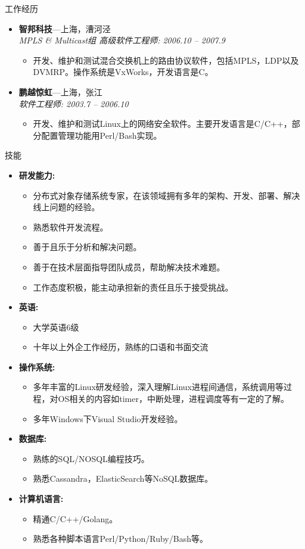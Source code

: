\documentclass[11pt,oneside]{article}
\newenvironment{ressection}[1]{
	\vspace{4pt}
	{\selectfont\Large#1}
	\begin{itemize}
	\vspace{3pt}
}{
	\end{itemize}
}
\newcommand{\resitem}[1]{
	\vspace{-4pt}
	\item \begin{flushleft} #1 \end{flushleft}
}
\newcommand{\ressubitem}[1]{
	\vspace{-1pt}
	\item \begin{flushleft} #1 \end{flushleft}
}
\newcommand{\resbigitem}[3]{
	\vspace{-5pt}
	\item
	\textbf{#1}---#2 \\
	\textit{#3}
}
\newenvironment{ressubsec}[3]{
	\resbigitem{#1}{#2}{#3}
	\vspace{-2pt}
	\begin{itemize}
}{
    \end{itemize}
}
\newenvironment{reslist}[1]{
	\resitem{\textbf{#1}}
	\vspace{-5pt}
	\begin{itemize}
}{
	\end{itemize}
}
\begin{document}
\begin{ressection}{工作经历}
	\begin{ressubsec}{智邦科技}{上海，漕河泾}{MPLS \& Multicast组 高级软件工程师: 2006.10 -- 2007.9}
		\ressubitem{开发、维护和测试混合交换机上的路由协议软件，包括MPLS，LDP以及DVMRP。操作系统是VxWorks，开发语言是C。}
	\end{ressubsec}

	\begin{ressubsec}{鹏越惊虹}{上海，张江}{软件工程师: 2003.7 -- 2006.10}
		\ressubitem{开发、维护和测试Linux上的网络安全软件。主要开发语言是C/C++，部分配置管理功能用Perl/Bash实现。}
	\end{ressubsec}

\end{ressection}

\begin{ressection}{技能}

	\begin{reslist}{研发能力:}
		\ressubitem{分布式对象存储系统专家，在该领域拥有多年的架构、开发、部署、解决线上问题的经验。}
		\ressubitem{熟悉软件开发流程。}
		\ressubitem{善于且乐于分析和解决问题。}
		\ressubitem{善于在技术层面指导团队成员，帮助解决技术难题。}
		\ressubitem{工作态度积极，能主动承担新的责任且乐于接受挑战。}
	\end{reslist}

	\begin{reslist}{英语:}
		\ressubitem{大学英语6级}
		\ressubitem{十年以上外企工作经历，熟练的口语和书面交流}
	\end{reslist}

	\begin{reslist}{操作系统:}
		\ressubitem{多年丰富的Linux研发经验，深入理解Linux进程间通信，系统调用等过程，对OS相关的内容如timer，中断处理，进程调度等有一定的了解。}
		\ressubitem{多年Windows下Visual Studio开发经验。}
	\end{reslist}

	\begin{reslist}{数据库:}
		\ressubitem{熟练的SQL/NOSQL编程技巧。}
		\ressubitem{熟悉Cassandra，ElasticSearch等NoSQL数据库。}
	\end{reslist}

	\begin{reslist}{计算机语言:}
		\ressubitem{精通C/C++/Golang。}
		\ressubitem{熟悉各种脚本语言Perl/Python/Ruby/Bash等。}
	\end{reslist}

\end{ressection}
\end{document}
